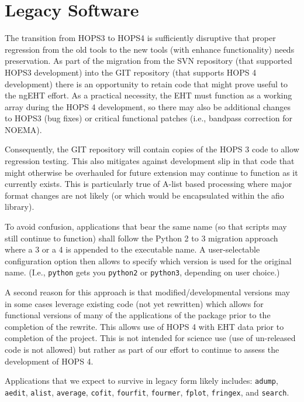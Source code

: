%
%
\section{Legacy Software}
\label{sec:legacy}

The transition from HOPS3 to HOPS4 is sufficiently disruptive that proper
regression from the old tools to the new tools (with enhance functionality)
needs preservation.  As part of the migration from the SVN repository (that
supported HOPS3 development) into the GIT repository (that supports HOPS 4
development) there is an opportunity to retain code that might prove useful
to the ngEHT effort.  As a practical necessity, the EHT must function as a
working array during the HOPS 4 development, so there may also be additional
changes to HOPS3 (bug fixes) or critical functional patches (i.e., bandpass
correction for NOEMA).

Consequently, the GIT repository will contain copies of the HOPS 3 code to
allow regression testing.  This also mitigates against development slip in
that code that might otherwise be overhauled for future extension may continue
to function as it currently exists.  This is particularly true of A-list based
processing where major format changes are not likely (or which would be
encapsulated within the afio library).

To avoid confusion, applications that bear the same name (so that scripts may
still continue to function) shall follow the Python 2 to 3 migration approach
where a 3 or a 4 is appended to the executable name.  A user-selectable
configuration option then allows to specify which version is used for the
original name.  (I.e.,
\texttt{python} gets you 
\texttt{python2} or 
\texttt{python3}, depending on user choice.)

A second reason for this approach is that modified/developmental versions may
in some cases leverage existing code (not yet rewritten) which allows for
functional versions of many of the applications of the package prior to the
completion of the rewrite.  This allows use of HOPS 4 with EHT data prior to
completion of the project.  This is not intended for science use (use of
un-released code is not allowed) but rather as part of our effort to continue
to assess the development of HOPS 4.

Applications that we expect to survive in legacy form likely includes:
\texttt{adump},
\texttt{aedit},
\texttt{alist},
\texttt{average},
\texttt{cofit},
\texttt{fourfit},
\texttt{fourmer},
\texttt{fplot},
\texttt{fringex},
and
\texttt{search}.

%
%
